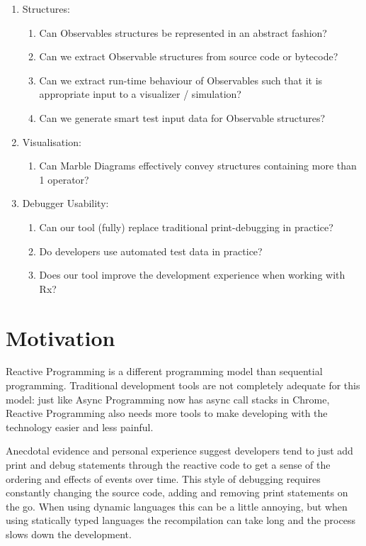\documentclass[11pt,a4paper]{article}
\begin{document}
\begin{enumerate}
	
\item Structures:
\begin{enumerate}
	\item Can Observables structures be represented in an abstract fashion?
	\item Can we extract Observable structures from source code or bytecode?
	\item Can we extract run-time behaviour of Observables such that it is appropriate input to a visualizer / simulation?
	\item Can we generate smart test input data for Observable structures?
\end{enumerate}

\item Visualisation:
\begin{enumerate}
	\item Can Marble Diagrams effectively convey structures containing more than 1 operator?
\end{enumerate}

\item Debugger Usability:
\begin{enumerate}
	\item Can our tool (fully) replace traditional print-debugging in practice?
	\item Do developers use automated test data in practice?
	\item Does our tool improve the development experience when working with Rx?
\end{enumerate}

\end{enumerate}


\section{Motivation}
Reactive Programming is a different programming model than sequential programming. Traditional development tools are not completely adequate for this model: just like Async Programming now has async call stacks in Chrome, Reactive Programming also needs more tools to make developing with the technology easier and less painful. 

Anecdotal evidence and personal experience suggest developers tend to just add print and debug statements through the reactive code to get a sense of the ordering and effects of events over time. This style of debugging requires constantly changing the source code, adding and removing print statements on the go. When using dynamic languages this can be a little annoying, but when using statically typed languages the recompilation can take long and the process slows down the development.
\end{document}
